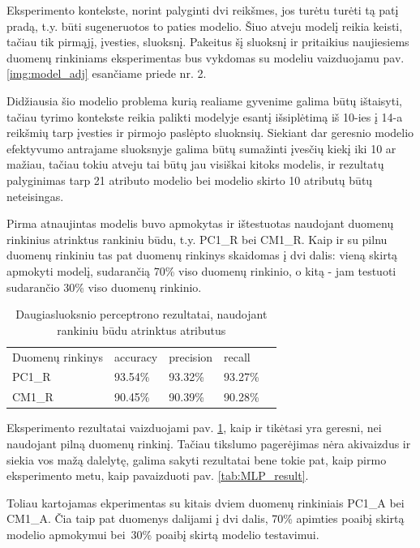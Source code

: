 \documentclass{VUMIFPSbakalaurinis}
\begin{document}
Eksperimento kontekste, norint palyginti dvi reikšmes, jos turėtu turėti tą patį pradą, t.y. būti sugeneruotos to paties modelio. Šiuo atveju modelį reikia keisti, tačiau tik pirmąjį, įvesties, sluoksnį. Pakeitus šį sluoksnį ir pritaikius naujiesiems duomenų rinkiniams eksperimentas bus vykdomas su modeliu vaizduojamu pav. \ref{img:model_adj} esančiame priede nr. 2.

Didžiausia šio modelio problema kurią realiame gyvenime galima būtų ištaisyti, tačiau tyrimo kontekste reikia palikti modelyje esantį išsiplėtimą iš 10-ies į 14-a reikšmių tarp įvesties ir pirmojo paslėpto sluoknsių. Siekiant dar geresnio modelio efektyvumo antrajame sluoksnyje galima būtų sumažinti įvesčių kiekį iki 10 ar mažiau, tačiau tokiu atveju tai būtų jau visiškai kitoks modelis, ir rezultatų palyginimas tarp 21 atributo modelio bei modelio skirto 10 atributų būtų neteisingas.

Pirma atnaujintas modelis buvo apmokytas ir ištestuotas naudojant duomenų rinkinius atrinktus rankiniu būdu, t.y. PC1\_R bei CM1\_R. Kaip ir su pilnu duomenų rinkiniu tas pat duomenų rinkinys skaidomas į dvi dalis: vieną skirtą apmokyti modelį, sudarančią 70\% viso duomenų rinkinio, o kitą - jam testuoti sudarančio 30\% viso duomenų rinkinio.

\begin{table}[H]\footnotesize
\centering
\caption{Daugiasluoksnio perceptrono rezultatai, naudojant rankiniu būdu atrinktus atributus}
\label{tab:MLP_result_1}
\begin{tabular}{lllll}
\cline{1-4}
\multicolumn{1}{|l}{Duomenų rinkinys} & accuracy & precision & \multicolumn{1}{l|}{recall} &  \\ \cline{1-4}
\multicolumn{1}{|l}{PC1\_R}              & 93.54\%   &93.32\%     & \multicolumn{1}{l|}{93.27\%} &  \\
\multicolumn{1}{|l}{CM1\_R}              & 90.45\%    & 90.39\%     & \multicolumn{1}{l|}{90.28\%}  &  \\ \cline{1-4}
\end{tabular}
\end{table}

Eksperimento rezultatai vaizduojami pav. \ref{tab:MLP_result_1}, kaip ir tikėtasi yra geresni, nei naudojant pilną duomenų rinkinį. Tačiau tikslumo pagerėjimas nėra akivaizdus ir siekia vos mažą dalelytę, galima sakyti rezultatai bene tokie pat, kaip pirmo eksperimento metu, kaip pavaizduoti pav. \ref{tab:MLP_result}.

Toliau kartojamas ekperimentas su kitais dviem duomenų rinkiniais PC1\_A bei CM1\_A. Čia taip pat duomenys dalijami į dvi dalis, 70\% apimties poaibį skirtą modelio apmokymui bei 30\% poaibį skirtą modelio testavimui.
\end{document}
